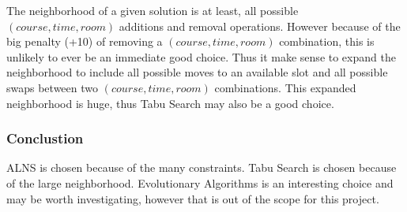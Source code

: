 The neighborhood of a given solution is at least, all possible $(course, time, room)$ additions and removal operations. However because of the big penalty (+10) of removing a $(course, time, room)$ combination, this is unlikely to ever be an immediate good choice. Thus it make sense to expand the neighborhood to include all possible moves to an available slot and all possible swaps between two $(course, time, room)$ combinations. This expanded neighborhood is huge, thus Tabu Search may also be a good choice.

\subsubsection{Conclustion}

ALNS is chosen because of the many constraints. Tabu Search is chosen because of the large neighborhood. Evolutionary Algorithms is an interesting choice and may be worth investigating, however that is out of the scope for this project.
